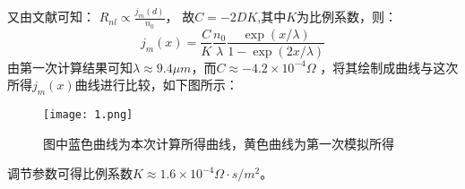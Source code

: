 \documentclass{article}
\begin{document}
又由文献可知：
$
R_{nl}\propto\tfrac{j_m(d)}{n_0}
$，
故$C=-2DK$,其中$K$为比例系数，则：
\begin{equation}\label{12}
j_m(x)=\dfrac{C}{K}\dfrac{n_0}{\lambda}\dfrac{\exp(x/\lambda)}{1-\exp{(2x/\lambda)}}
\end{equation}
由第一次计算结果可知$\lambda\approx9.4\mu m$，而$C\approx-4.2\times10^{-4}\Omega$
，将其绘制成曲线与这次所得$j_m(x)$曲线进行比较，如下图所示：
\begin{figure}[ht]
\centering
\texttt{[image: 1.png]}
\caption{图中蓝色曲线为本次计算所得曲线，黄色曲线为第一次模拟所得}
\end{figure}

调节参数可得比例系数$K\approx1.6\times10^{-4}\Omega\cdot s/m^2$。
\end{document}
